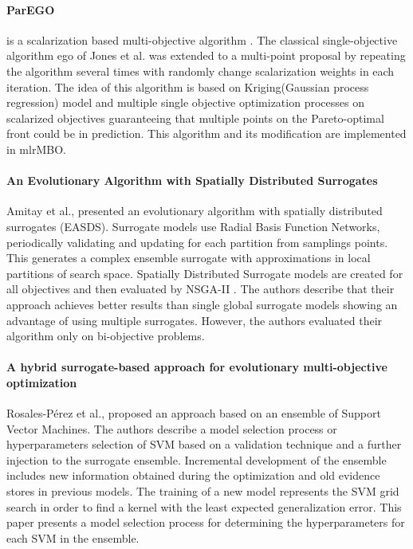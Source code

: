         \paragraph{ParEGO}\label{alg:ParEGO} is a scalarization based multi-objective algorithm \cite{Knowles06}. The classical single-objective algorithm \gls{ego} \cite{JonesSW98} of Jones et al. was extended to a multi-point proposal by repeating the algorithm several times with randomly change scalarization weights in each iteration.  The idea of this algorithm is based on Kriging(Gaussian process regression) model and multiple single objective optimization processes on scalarized objectives guaranteeing that multiple points on the Pareto-optimal front could be in prediction. This algorithm and its modification are implemented in mlrMBO\cite{BischlmlrMBO}.


        \paragraph{An Evolutionary Algorithm with Spatially Distributed Surrogates} Amitay et al.,\cite{DistrSurr} presented an evolutionary algorithm with spatially distributed surrogates (EASDS). Surrogate models use Radial Basis Function Networks, periodically validating and updating for each partition from samplings points. This generates a complex ensemble surrogate with approximations in local partitions of search space. Spatially Distributed Surrogate models are created for all objectives and then evaluated by NSGA-II \cite{DistrSurr}. The authors describe that their approach achieves better results than single global surrogate models showing an advantage of using multiple surrogates. However, the authors evaluated their algorithm only on bi-objective problems.

        \paragraph{A hybrid surrogate-based approach for evolutionary multi-objective optimization} Rosales-Pérez et al.,\cite{HybridSurrRCG} proposed an approach based on an ensemble of Support Vector Machines. The authors describe a model selection process or hyperparameters selection of SVM based on a validation technique and a further injection to the surrogate ensemble. Incremental development of the ensemble includes new information obtained during the optimization and old evidence stores in previous models. 
        The training of a new model represents the SVM grid search in order to find a kernel with the least expected generalization error. This paper presents a model selection process for determining the hyperparameters for each SVM in the ensemble.


